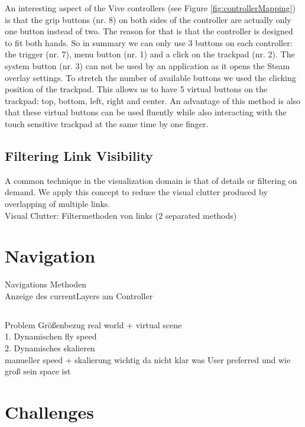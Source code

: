 An interesting aspect of the Vive controllers (see Figure \ref{fig:controllerMapping}) is that the grip buttons (nr. 8) on both sides of the controller are actually only one button instead of two. The reason for that is that the controller is designed to fit both hands. 
So in summary we can only use 3 buttons on each controller: the trigger (nr. 7), menu button (nr. 1) and a click on the trackpad (nr. 2). The system button (nr. 3) can not be used by an application as it opens the Steam overlay settings. To stretch the number of available buttons we used the clicking position of the trackpad. This allows us to have 5 virtual buttons on the trackpad: top, bottom, left, right and center. An advantage of this method is also that these virtual buttons can be used fluently while also interacting with the touch sensitive trackpad at the same time by one finger. 

\subsection{Filtering Link Visibility}
A common technique in the visualization domain is that of details or filtering on demand. We apply this concept to reduce the visual clutter produced by overlapping of multiple links.\\
Visual Clutter: Filtermethoden von links (2 separated methods)\\

\section{Navigation }
\label{chap:solution-navigation}
Navigations Methoden\\
Anzeige des currentLayers am Controller\\

\subsection{}
Problem Größenbezug real world + virtual scene\\
1. Dynamischen fly speed\\
2. Dynamisches skalieren\\
manueller speed + skalierung wichtig da nicht klar was User preferred und wie groß sein space ist\\ 
\section{Challenges}

